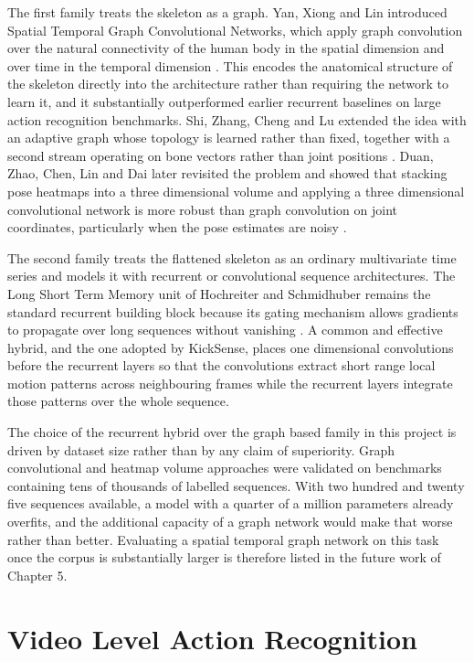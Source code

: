 The first family treats the skeleton as a graph. Yan, Xiong and Lin introduced Spatial Temporal Graph Convolutional Networks, which apply graph convolution over the natural connectivity of the human body in the spatial dimension and over time in the temporal dimension \cite{yan2018}. This encodes the anatomical structure of the skeleton directly into the architecture rather than requiring the network to learn it, and it substantially outperformed earlier recurrent baselines on large action recognition benchmarks. Shi, Zhang, Cheng and Lu extended the idea with an adaptive graph whose topology is learned rather than fixed, together with a second stream operating on bone vectors rather than joint positions \cite{shi2019}. Duan, Zhao, Chen, Lin and Dai later revisited the problem and showed that stacking pose heatmaps into a three dimensional volume and applying a three dimensional convolutional network is more robust than graph convolution on joint coordinates, particularly when the pose estimates are noisy \cite{duan2022}.

The second family treats the flattened skeleton as an ordinary multivariate time series and models it with recurrent or convolutional sequence architectures. The Long Short Term Memory unit of Hochreiter and Schmidhuber remains the standard recurrent building block because its gating mechanism allows gradients to propagate over long sequences without vanishing \cite{hochreiter1997}. A common and effective hybrid, and the one adopted by KickSense, places one dimensional convolutions before the recurrent layers so that the convolutions extract short range local motion patterns across neighbouring frames while the recurrent layers integrate those patterns over the whole sequence.

The choice of the recurrent hybrid over the graph based family in this project is driven by dataset size rather than by any claim of superiority. Graph convolutional and heatmap volume approaches were validated on benchmarks containing tens of thousands of labelled sequences. With two hundred and twenty five sequences available, a model with a quarter of a million parameters already overfits, and the additional capacity of a graph network would make that worse rather than better. Evaluating a spatial temporal graph network on this task once the corpus is substantially larger is therefore listed in the future work of Chapter 5.

\section{Video Level Action Recognition}

